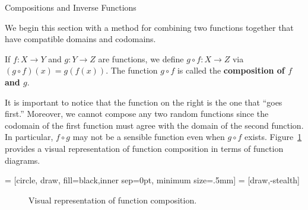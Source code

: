 \begin{section}{Compositions and Inverse Functions}

We begin this section with a method for combining two functions together that have compatible domains and codomains.

\begin{definition}
If $f:X\to Y$ and $g:Y\to Z$ are functions, we define $g\circ f:X\to Z$ via $(g\circ f)(x)=g(f(x))$. The function $g\circ f$ is called the \textbf{composition of $f$ and $g$}.
\end{definition}

It is important to notice that the function on the right is the one that ``goes first.''  Moreover, we cannot compose any two random functions since the codomain of the first function must agree with the domain of the second function.  In particular, $f\circ g$ may not be a sensible function even when $g\circ f$ exists. Figure~\ref{fig:function composition} provides a visual representation of function composition in terms of function diagrams.

 = [circle, draw, fill=black,inner sep=0pt, minimum size=.5mm]
 = [draw,-stealth]

\begin{figure}[h!]
\begin{center}
\caption{Visual representation of function composition.}\label{fig:function composition}
\end{center}
\end{figure}


\end{section}
